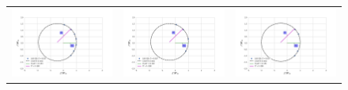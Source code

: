 \begin{figure}
\begin{tabular}{@{}c@{}c@{}c@{}}
\includegraphics[clip]{./Programs/LV-bowshocks-xyfancy-positionswill-168-328} &  \includegraphics[clip]{./Programs/Multi-Fit/samp00/LV-bowshocks-xyfancy-positionssamp00-168-328} & \includegraphics[clip]{./Programs/Multi-Fit/samp01/LV-bowshocks-xyfancy-positionssamp01-168-328}

\end{tabular}
\end{figure}
